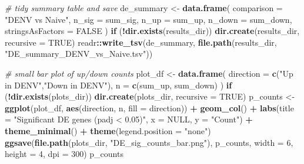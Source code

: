 \documentclass[
]{article}
\newenvironment{Shaded}{\begin{snugshade}}{\end{snugshade}}
\newcommand{\AttributeTok}[1]{\textcolor[rgb]{0.13,0.29,0.53}{#1}}
\newcommand{\CommentTok}[1]{\textcolor[rgb]{0.56,0.35,0.01}{\textit{#1}}}
\newcommand{\ConstantTok}[1]{\textcolor[rgb]{0.56,0.35,0.01}{#1}}
\newcommand{\ControlFlowTok}[1]{\textcolor[rgb]{0.13,0.29,0.53}{\textbf{#1}}}
\newcommand{\DecValTok}[1]{\textcolor[rgb]{0.00,0.00,0.81}{#1}}
\newcommand{\FunctionTok}[1]{\textcolor[rgb]{0.13,0.29,0.53}{\textbf{#1}}}
\newcommand{\NormalTok}[1]{#1}
\newcommand{\OtherTok}[1]{\textcolor[rgb]{0.56,0.35,0.01}{#1}}
\newcommand{\SpecialCharTok}[1]{\textcolor[rgb]{0.81,0.36,0.00}{\textbf{#1}}}
\newcommand{\StringTok}[1]{\textcolor[rgb]{0.31,0.60,0.02}{#1}}
\begin{document}
\begin{Shaded}
\begin{Highlighting}[]
\CommentTok{\# tidy summary table and save}
\NormalTok{de\_summary }\OtherTok{\textless{}{-}} \FunctionTok{data.frame}\NormalTok{(}
  \AttributeTok{comparison =} \StringTok{"DENV vs Naive"}\NormalTok{,}
  \AttributeTok{n\_sig =}\NormalTok{ sum\_sig,}
  \AttributeTok{n\_up  =}\NormalTok{ sum\_up,}
  \AttributeTok{n\_down =}\NormalTok{ sum\_down,}
  \AttributeTok{stringsAsFactors =} \ConstantTok{FALSE}
\NormalTok{)}
\ControlFlowTok{if}\NormalTok{ (}\SpecialCharTok{!}\FunctionTok{dir.exists}\NormalTok{(results\_dir)) }\FunctionTok{dir.create}\NormalTok{(results\_dir, }\AttributeTok{recursive =} \ConstantTok{TRUE}\NormalTok{)}
\NormalTok{readr}\SpecialCharTok{::}\FunctionTok{write\_tsv}\NormalTok{(de\_summary, }\FunctionTok{file.path}\NormalTok{(results\_dir, }\StringTok{"DE\_summary\_DENV\_vs\_Naive.tsv"}\NormalTok{))}

\CommentTok{\# small bar plot of up/down counts}
\NormalTok{plot\_df }\OtherTok{\textless{}{-}} \FunctionTok{data.frame}\NormalTok{(}
  \AttributeTok{direction =} \FunctionTok{c}\NormalTok{(}\StringTok{"Up in DENV"}\NormalTok{,}\StringTok{"Down in DENV"}\NormalTok{),}
  \AttributeTok{n =} \FunctionTok{c}\NormalTok{(sum\_up, sum\_down)}
\NormalTok{)}
\ControlFlowTok{if}\NormalTok{ (}\SpecialCharTok{!}\FunctionTok{dir.exists}\NormalTok{(plots\_dir)) }\FunctionTok{dir.create}\NormalTok{(plots\_dir, }\AttributeTok{recursive =} \ConstantTok{TRUE}\NormalTok{)}
\NormalTok{p\_counts }\OtherTok{\textless{}{-}} \FunctionTok{ggplot}\NormalTok{(plot\_df, }\FunctionTok{aes}\NormalTok{(direction, n, }\AttributeTok{fill =}\NormalTok{ direction)) }\SpecialCharTok{+}
  \FunctionTok{geom\_col}\NormalTok{() }\SpecialCharTok{+}
  \FunctionTok{labs}\NormalTok{(}\AttributeTok{title =} \StringTok{"Significant DE genes (padj \textless{} 0.05)"}\NormalTok{, }\AttributeTok{x =} \ConstantTok{NULL}\NormalTok{, }\AttributeTok{y =} \StringTok{"Count"}\NormalTok{) }\SpecialCharTok{+}
  \FunctionTok{theme\_minimal}\NormalTok{() }\SpecialCharTok{+} \FunctionTok{theme}\NormalTok{(}\AttributeTok{legend.position =} \StringTok{"none"}\NormalTok{)}
\FunctionTok{ggsave}\NormalTok{(}\FunctionTok{file.path}\NormalTok{(plots\_dir, }\StringTok{"DE\_sig\_counts\_bar.png"}\NormalTok{), p\_counts, }\AttributeTok{width =} \DecValTok{6}\NormalTok{, }\AttributeTok{height =} \DecValTok{4}\NormalTok{, }\AttributeTok{dpi =} \DecValTok{300}\NormalTok{)}
\NormalTok{p\_counts}
\end{Highlighting}
\end{Shaded}
\end{document}
